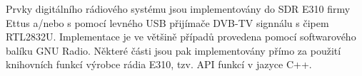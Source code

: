 Prvky digitálního rádiového systému jsou implementovány do SDR E310 firmy Ettus a/nebo s pomocí levného USB přijímače DVB-TV signnálu s čipem RTL2832U. Implementace je ve většině případů provedena pomocí softwarového balíku GNU Radio. Některé části jsou pak implementovány přímo za použití knihovních funkcí výrobce rádia E310, tzv. API funkcí v jazyce C++.

%
